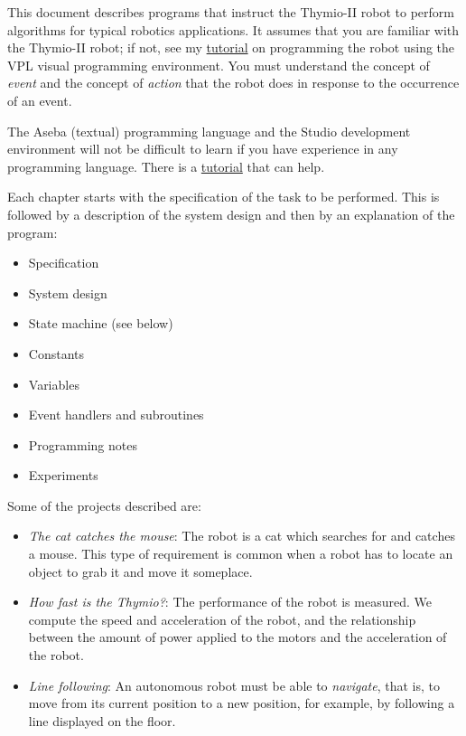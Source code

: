 

This document describes programs that instruct the Thymio-II robot to
perform algorithms for typical robotics applications. It assumes that
you are familiar with the Thymio-II robot; if not, see my
\href{https://aseba.wdfiles.com/local--files/en:thymioprogram/thymio-vpl-tutorial-en.zip}{tutorial}
on programming the robot using the VPL visual programming environment.
You must understand the concept of \emph{event} and the concept of
\emph{action} that the robot does in response to the occurrence of an
event.

The Aseba (textual) programming language and the Studio development
environment will not be difficult to learn if you have experience in any
programming language. There is a
\href{https://aseba.wikidot.com/en:thymiotutoriel}{tutorial} that can
help.


Each chapter starts with the specification of the task to be performed.
This is followed by a description of the system design and then by an
explanation of the program:

\begin{itemize}
\item Specification
\item System design
\item State machine (see below)
\item Constants
\item Variables
\item Event handlers and subroutines
\item Programming notes
\item Experiments
\end{itemize}


\newpage

Some of the projects described are:

\begin{itemize}

\item \emph{The cat catches the mouse}: The robot is a cat which
searches for and catches a mouse. This type of requirement is common
when a robot has to locate an object to grab it and move it someplace.

\item \emph{How fast is the Thymio?}: The performance of the robot is
measured. We compute the speed and acceleration of the robot, and
the relationship between the amount of power applied to the motors and
the acceleration of the robot.

\item \emph{Line following}: An autonomous robot must be able to
\emph{navigate}, that is, to move from its current position to a new
position, for example, by following a line displayed on the floor.

\end{itemize}

